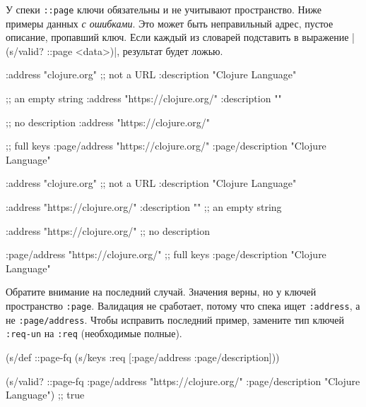 У спеки \verb|::page| ключи обязательны и не учитывают пространство. Ниже
примеры данных \emph{с ошибками}. Это может быть неправильный адрес, пустое
описание, пропавший ключ. Если каждый из словарей подставить в выражение
\spverb|(s/valid? ::page <data>)|, результат будет ложью.

\ifx\DEVICETYPE\MOBILE

\begin{english}
  \begin{clojure}
{:address "clojure.org" ;; not a URL
 :description "Clojure Language"}

;; an empty string
{:address "https://clojure.org/"
 :description ""}

;; no description
{:address "https://clojure.org/"}

 ;; full keys
{:page/address "https://clojure.org/"
 :page/description "Clojure Language"}
  \end{clojure}
\end{english}

\else

\begin{english}
  \begin{clojure}
{:address "clojure.org" ;; not a URL
 :description "Clojure Language"}

{:address "https://clojure.org/"
 :description ""} ;; an empty string

{:address "https://clojure.org/"} ;; no description

{:page/address "https://clojure.org/" ;; full keys
 :page/description "Clojure Language"}
  \end{clojure}
\end{english}

\fi

Обратите внимание на последний случай. Значения верны, но у ключей пространство
\verb|:page|. Валидация не сработает, потому что спека ищет \verb|:address|,
а не \verb|:page/address|. Чтобы исправить последний пример, замените тип
ключей \verb|:req-un| на \verb|:req| (необходимые полные).


\ifx\DEVICETYPE\MOBILE

\begin{english}
  \begin{clojure}
(s/def ::page-fq
  (s/keys :req [:page/address
                :page/description]))

(s/valid? ::page-fq
  {:page/address "https://clojure.org/"
   :page/description "Clojure Language"})
;; true
  \end{clojure}
\end{english}

